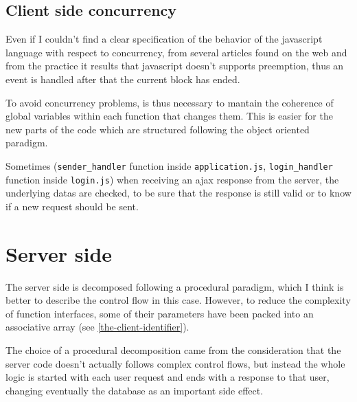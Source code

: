 \documentclass[10pt,a4paper,english]{book}
\begin{document}

\hypertarget{client-side-concurrency}{}
\subsection{Client side concurrency}
\label{client-side-concurrency}

Even if I couldn't find a clear specification of the behavior of the
javascript language with respect to concurrency, from several articles
found on the web and from the practice it results that javascript
doesn't supports preemption, thus an event is handled after that the
current block has ended.

To avoid concurrency problems, is thus necessary to mantain the
coherence of global variables within each function that changes
them. This is easier for the new parts of the code which are
structured following the object oriented paradigm.

Sometimes (\texttt{sender{\_}handler} function inside \texttt{application.js},
\texttt{login{\_}handler} function inside \texttt{login.js}) when receiving an ajax
response from the server, the underlying datas are checked, to be sure
that the response is still valid or to know if a new request should be
sent.



\hypertarget{server-side}{}
\section{Server side}
\label{server-side}

The server side is decomposed following a procedural paradigm, which I
think is better to describe the control flow in this case. However, to
reduce the complexity of function interfaces, some of their parameters
have been packed into an associative array (see \href{\#the-client-identifier}{\ref*{the-client-identifier}}).

The choice of a procedural decomposition came from the consideration
that the server code doesn't actually follows complex control flows,
but instead the whole logic is started with each user request and ends
with a response to that user, changing eventually the database as an
important side effect.


\end{document}
